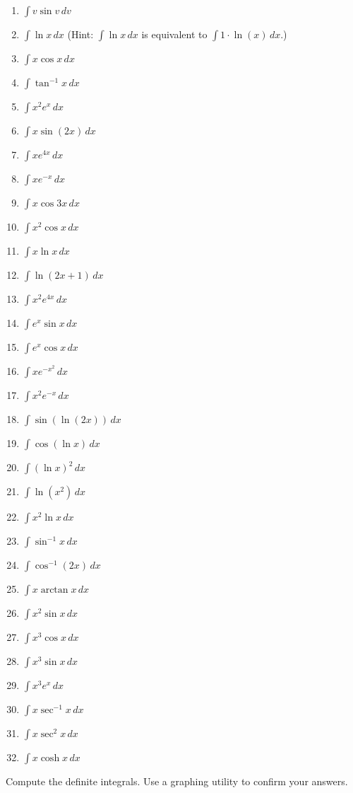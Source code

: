 \documentclass{exercises}
\begin{document}
\begin{enumerate}[resume]
\item $\int v\sin v\,dv$
\item $\int \ln x\,dx$ (Hint: $\int \ln x\,dx$ is equivalent to $\int 1\cdot \ln(x)\,dx$.)
\item $\int x\cos x\,dx$
\item $\int \tan^{-1}x\,dx$
\item $\int x^{2}e^{x}\,dx$
\item $\int x\sin(2x)\,dx$
\item $\int xe^{4x}\,dx$
\item $\int xe^{-x}\,dx$
\item $\int x\cos 3x\,dx$
\item $\int x^{2}\cos x\,dx$
\item $\int x\ln x\,dx$
\item $\int \ln(2x+1)\,dx$
\item $\int x^{2}e^{4x}\,dx$
\item $\int e^{x}\sin x\,dx$
\item $\int e^{x}\cos x\,dx$
\item $\int xe^{-x^{2}}\,dx$
\item $\int x^{2}e^{-x}\,dx$
\item $\int \sin(\ln(2x))\,dx$
\item $\int \cos(\ln x)\,dx$
\item $\int (\ln x)^{2}\,dx$
\item $\int \ln(x^{2})\,dx$
\item $\int x^{2}\ln x\,dx$
\item $\int \sin^{-1}x\,dx$
\item $\int \cos^{-1}(2x)\,dx$
\item $\int x\arctan x\,dx$
\item $\int x^{2}\sin x\,dx$
\item $\int x^{3}\cos x\,dx$
\item $\int x^{3}\sin x\,dx$
\item $\int x^{3}e^{x}\,dx$
\item $\int x\sec^{-1}x\,dx$
\item $\int x\sec^{2}x\,dx$
\item $\int x\cosh x\,dx$
\end{enumerate}

Compute the definite integrals. Use a graphing utility to confirm your answers.
\end{document}
